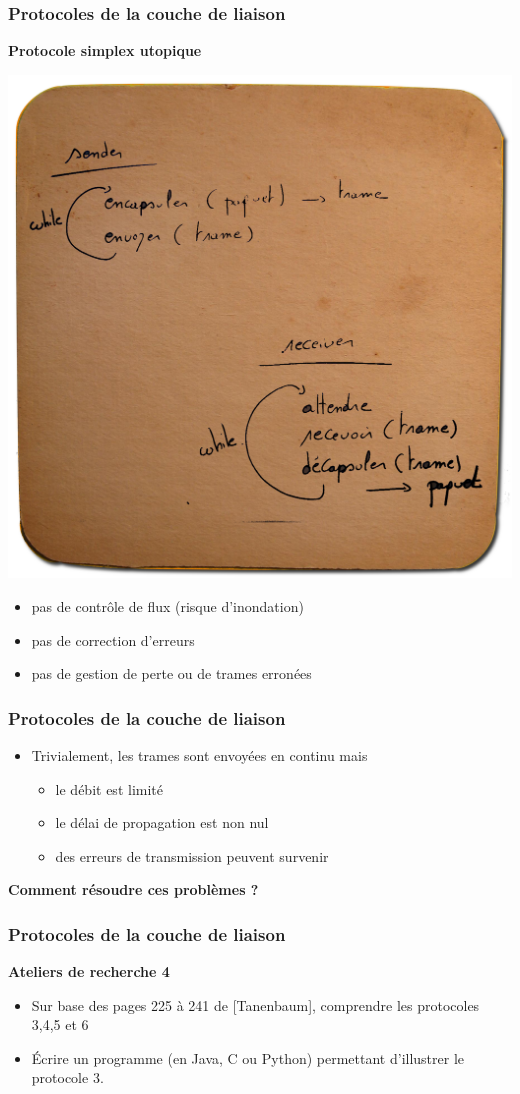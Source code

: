 \begin{frame}[fragile]
  \frametitle{Protocoles de la couche de liaison}
{\large\bf Protocole simplex utopique}
\begin{center}
	\includegraphics[width=.4\linewidth]{img/sousbock-protocole-1.png}
\end{center}
\begin{itemize}
	\item pas de contrôle de flux (risque d'inondation)
	\item pas de correction d'erreurs
	\item pas de gestion de perte ou de trames erronées
\end{itemize}
\end{frame}

\begin{frame}[fragile]
  \frametitle{ Protocoles de la couche de liaison}
\begin{itemize}
	\item Trivialement, les trames sont envoyées en continu mais
	\begin{itemize}
		\item le débit est limité
		\item le délai de propagation est non nul
		\item des erreurs de transmission peuvent survenir
	\end{itemize}
\end{itemize}
\begin{center}
	\bf Comment résoudre ces problèmes ?
\end{center}
\end{frame}

\begin{frame}[fragile]
	\frametitle{Protocoles de la couche de liaison}
{\large\bf Ateliers de recherche 4}
\begin{itemize}
	\item Sur base des pages 225 à 241 de [Tanenbaum], comprendre les protocoles
	3,4,5 et 6
	\item Écrire un programme (en Java, C ou Python) permettant d'illustrer le
	protocole 3. 
\end{itemize}
\end{frame}



